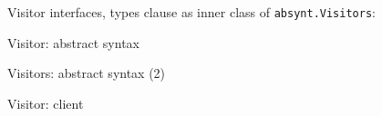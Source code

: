 \begin{myslide}{Visitor interfaces, types clause}
  \lstset{language=java}
  \lstset{basicstyle=\scriptsize\ttfamily}
  as inner class of \texttt{absynt.Visitors}:
  
\end{myslide}
\begin{myslide}{Visitor: abstract syntax}
  \lstset{language=java}
  \lstset{basicstyle=\tiny\ttfamily}
  
\end{myslide}

\begin{myslide}{Visitors: abstract syntax (2)}
  \lstset{language=java}
  \lstset{basicstyle=\tiny\ttfamily}
  
\end{myslide}

\begin{myslide}{Visitor: client}

  \lstset{language=java}
  \lstset{basicstyle=\tiny\ttfamily}
  \hspace{-2.3cm}
  \begin{minipage}{10cm}
    
  \end{minipage}

  
\end{myslide}

